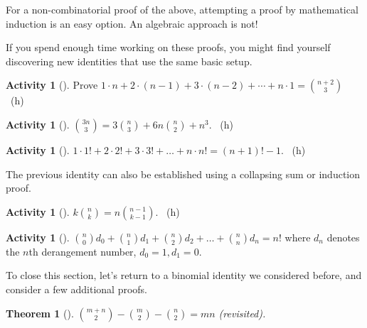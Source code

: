 \documentclass[10pt,]{book}
\theoremstyle{plain}
\newtheorem{theorem}{Theorem}[section]
\theoremstyle{definition}
\theoremstyle{definition}
\theoremstyle{definition}
\newtheorem{activity}[project]{Activity}
\numberwithin{equation}{chapter}
\begin{document}
\hypertarget{p-715}{}%
For a non-combinatorial proof of the above, attempting a proof by mathematical induction is an easy option. An algebraic approach is not!%
\par
\hypertarget{p-716}{}%
If you spend enough time working on these proofs, you might find yourself discovering new identities that use the same basic setup.%
\begin{activity}[]\label{activity-96}
\hypertarget{p-717}{}%
Prove \(1\cdot n + 2 \cdot (n-1) + 3 \cdot (n-2) + \cdots + n \cdot 1 = \binom{n+2}{3}\)%
~{\tiny (h)}\end{activity}
\begin{activity}[]\label{activity-97}
\hypertarget{p-721}{}%
\(\binom{3n}{3} = 3 \binom{n}{3} + 6n \binom{n}{2} + n^{3}\).%
~{\tiny (h)}\end{activity}
\begin{activity}[]\label{activity-98}
\hypertarget{p-724}{}%
\(1 \cdot 1! + 2 \cdot 2! + 3 \cdot 3! + \ldots + n \cdot n! = \left( n + 1 \right)! - 1\).%
~{\tiny (h)}\end{activity}
\hypertarget{p-727}{}%
The previous identity can also be established using a collapsing sum or induction proof.%
\begin{activity}[]\label{activity-99}
\hypertarget{p-728}{}%
\(k \binom{n}{k} = n \binom{n - 1}{k - 1}\).%
~{\tiny (h)}\end{activity}
\begin{activity}[]\label{activity-100}
\hypertarget{p-732}{}%
\(\binom{n}{0} d_{0} + \binom{n}{1} d_{1} + \binom{n}{2} d_{2} + \ldots + \binom{n}{n} d_{n} = n!\) where \(d_{n}\) denotes the \(n\)th derangement number, \(d_{0} = 1,d_{1} = 0\).%
\end{activity}
\hypertarget{p-734}{}%
To close this section, let's return to a binomial identity we considered before, and consider a few additional proofs.%
\begin{theorem}[{}]\label{theorem-11}
\hypertarget{p-735}{}%
\(\binom{m + n}{2} - \binom{m}{2} - \binom{n}{2} = mn\) (revisited).%
\end{theorem}
\end{document}
